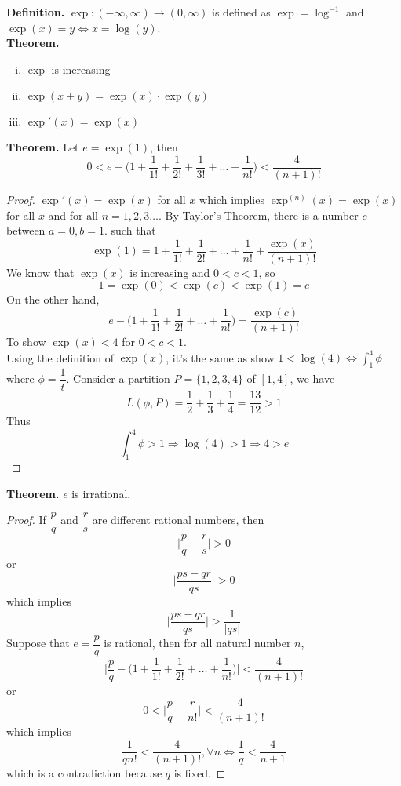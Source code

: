 \documentclass[10pt,letterpaper]{article}
\begin{document}
	\textbf{Definition. } 
	$\exp: (-\infty, \infty) \rightarrow (0, \infty)$ is defined as $\exp = \log^{-1}$
	and $\exp(x) = y \Leftrightarrow x = \log(y)$. \\
	
	\textbf{Theorem. } 
	\begin{enumerate}[(i)]
\item $\exp$ is increasing
\item $\exp(x + y) = \exp(x) \cdot \exp(y)$
\item $\exp'(x) = \exp(x)$
	\end{enumerate}

	\textbf{Theorem. }
	Let $e = \exp(1)$, then 
	$$0 < e - \bigg(1 + \dfrac{1}{1!} + \dfrac{1}{2!} + \dfrac{1}{3!} + \ldots
	+ \dfrac{1}{n!}\bigg) < \dfrac{4}{(n + 1)!}$$
	\begin{proof}
	$\exp'(x) = \exp(x)$ for all $x$ which implies
	$\exp^{(n)}(x) = \exp(x)$ for all $x$ and for all $n = 1, 2, 3 \ldots$.
	By Taylor's Theorem, there is a number $c$ between $a = 0, b = 1$.
	such that	
	$$\exp(1) = 1 + \dfrac{1}{1!} + \dfrac{1}{2!} + \ldots + \dfrac{1}{n!} + \dfrac{\exp(x)}{(n + 1)!}$$
	We know that $\exp(x)$ is increasing and $0 < c < 1$, so 
	$$1 = \exp(0) < \exp(c) < \exp(1) = e$$
	On the other hand,
	$$e - \bigg(1 + \dfrac{1}{1!} + \dfrac{1}{2!} + \ldots + \dfrac{1}{n!}\bigg) = 
	\dfrac{\exp(c)}{(n + 1)!}$$
	To show $\exp(x) < 4$ for $0 < c < 1$. \\
	Using the definition of $\exp(x)$, it's the same as show $1 < \log(4) 
	\Leftrightarrow \displaystyle\int_{1}^{4} \phi$ where $\phi = \dfrac{1}{t}$.
	Consider a partition $P = \{1, 2, 3, 4\}$ of $[1, 4]$, we have
	$$L(\phi, P) = \dfrac{1}{2} + \dfrac{1}{3} + \dfrac{1}{4} = \dfrac{13}{12} > 1$$
	Thus
	$$\displaystyle\int_{1}^{4} \phi > 1 \Rightarrow \log(4) > 1
	\Rightarrow 4 > e$$
	\end{proof}

	\textbf{Theorem. } $e$ is irrational.
	\begin{proof}
	If $\dfrac{p}{q}$ and $\dfrac{r}{s}$ are different rational numbers, then 
	$$\bigg|\dfrac{p}{q} - \dfrac{r}{s}\bigg| > 0$$
	or
	$$\bigg|\dfrac{ps - qr}{qs}\bigg| > 0$$
	which implies 
	$$\bigg|\dfrac{ps - qr}{qs}\bigg| > \dfrac{1}{|qs|}$$
	Suppose that $e = \dfrac{p}{q}$ is rational, then for all natural number $n$,
$$\bigg|\dfrac{p}{q} - \bigg(1 + \dfrac{1}{1!} + \dfrac{1}{2!} + \ldots + \dfrac{1}{n!} \bigg) \bigg| 
< \dfrac{4}{(n + 1)!}$$
	or
	$$0 < \bigg| \dfrac{p}{q} - \dfrac{r}{n!} \bigg| < \dfrac{4}{(n + 1)!}$$
	which implies
	$$\dfrac{1}{qn!} < \dfrac{4}{(n + 1)!} , \forall n
	\Leftrightarrow \dfrac{1}{q} < \dfrac{4}{n+1}$$ 
	which is a contradiction because $q$ is fixed.
		\end{proof}
		
\end{document}
